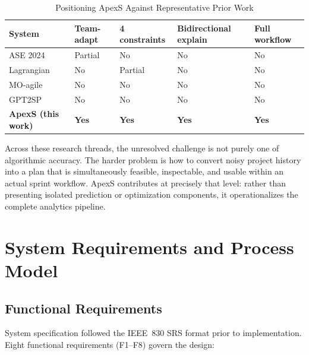 \documentclass[conference]{IEEEtran}
\begin{document}
\begin{table}[t]
	\caption{Positioning ApexS Against Representative Prior Work}
	\label{tab:related-comparison}
	\centering\small
	\begin{tabularx}{\columnwidth}{lYYYY}
		\toprule
		System                              & Team-adapt   & 4 constraints & Bidirectional explain & Full workflow \\
		\midrule
		ASE 2024 \cite{ase2024}             & Partial      & No            & No                    & No            \\
		Lagrangian \cite{lagrangian-sprint} & No           & Partial       & No                    & No            \\
		MO-agile \cite{agile-mo}            & No           & No            & No                    & No            \\
		GPT2SP \cite{gpt2sp}                & No           & No            & No                    & No            \\
		\textbf{ApexS (this work)}          & \textbf{Yes} & \textbf{Yes}  & \textbf{Yes}          & \textbf{Yes}  \\
		\bottomrule
	\end{tabularx}
\end{table}

Across these research threads, the unresolved challenge is not purely one of
algorithmic accuracy.
The harder problem is how to convert noisy project history into a plan that is
simultaneously feasible, inspectable, and usable within an actual sprint workflow.
ApexS contributes at precisely that level: rather than presenting isolated prediction
or optimization components, it operationalizes the complete analytics pipeline.

\section{System Requirements and Process Model}
\label{sec:requirements}

\subsection{Functional Requirements}

System specification followed the IEEE~830 SRS format prior to implementation.
Eight functional requirements (F1--F8) govern the design:
\end{document}
